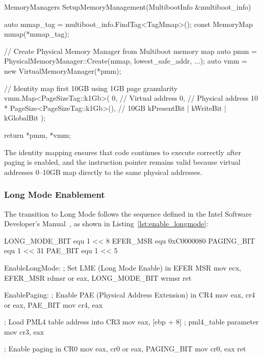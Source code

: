 \documentclass[a4paper,10pt,twoside]{report}
\theoremstyle{definition}
\begin{document}
\begin{cppcode}[caption={Identity Mapping Setup (main.cpp)}, label={lst:loader32_mmap}]
MemoryManagers SetupMemoryManagement(MultibootInfo &multiboot_info) {
    auto mmap_tag = multiboot_info.FindTag<TagMmap>();
    const MemoryMap mmap(*mmap_tag);
    
    // Create Physical Memory Manager from Multiboot memory map
    auto pmm = PhysicalMemoryManager::Create(mmap, lowest_safe_addr, ...);
    auto vmm = new VirtualMemoryManager(*pmm);
    
    // Identity map first 10GB using 1GB page granularity
    vmm.Map<PageSizeTag::k1Gb>(
        0,                                   // Virtual address
        0,                                   // Physical address  
        10 * PageSize<PageSizeTag::k1Gb>(),  // 10GB
        kPresentBit | kWriteBit | kGlobalBit
    );
    
    return {*pmm, *vmm};
}
\end{cppcode}

The identity mapping ensures that code continues to execute correctly after paging is enabled, and the instruction pointer remains valid because virtual addresses 0--10GB map directly to the same physical addresses.

\clearpage

\subsubsection{Long Mode Enablement}

The transition to Long Mode follows the sequence defined in the Intel Software Developer's Manual~\cite{Intel-ControlRegisters}, as shown in Listing~\ref{lst:enable_longmode}:

\begin{nasmcode}[caption={Enabling Long Mode and Paging (enables.nasm)}, label={lst:enable_longmode}]
LONG_MODE_BIT equ 1 << 8
EFER_MSR      equ 0xC0000080
PAGING_BIT    equ 1 << 31
PAE_BIT       equ 1 << 5

EnableLongMode:
    ; Set LME (Long Mode Enable) in EFER MSR
    mov ecx, EFER_MSR
    rdmsr
    or eax, LONG_MODE_BIT
    wrmsr
    ret

EnablePaging:
    ; Enable PAE (Physical Address Extension) in CR4
    mov eax, cr4
    or eax, PAE_BIT
    mov cr4, eax
    
    ; Load PML4 table address into CR3
    mov eax, [ebp + 8]    ; pml4_table parameter
    mov cr3, eax
    
    ; Enable paging in CR0
    mov eax, cr0
    or eax, PAGING_BIT
    mov cr0, eax
    ret
\end{nasmcode}
\end{document}
